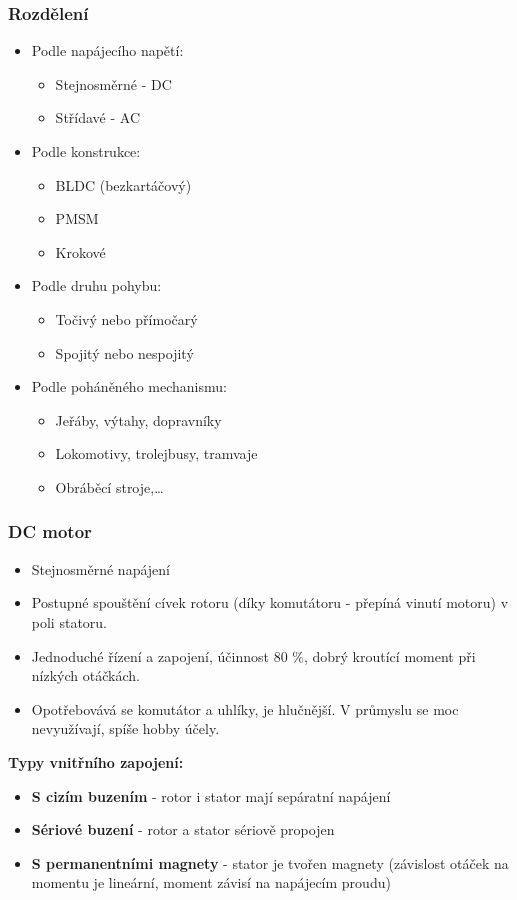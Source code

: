 \subsubsection*{Rozdělení}
\begin{itemize}
  \item Podle napájecího napětí: \begin{itemize}
    \item Stejnosměrné - DC
    \item Střídavé - AC 
  \end{itemize}
  \item Podle konstrukce: \begin{itemize}
    \item BLDC (bezkartáčový)
    \item PMSM 
    \item Krokové
  \end{itemize}
  \item Podle druhu pohybu: \begin{itemize}
    \item Točivý nebo přímočarý
    \item Spojitý nebo nespojitý
  \end{itemize}
  \item Podle poháněného mechanismu: \begin{itemize}
    \item Jeřáby, výtahy, dopravníky
    \item Lokomotivy, trolejbusy, tramvaje
    \item Obráběcí stroje,\dots
  \end{itemize}
\end{itemize}

\subsubsection*{DC motor}
\begin{itemize}
  \item Stejnosměrné napájení
  \item Postupné spouštění cívek rotoru (díky komutátoru - přepíná vinutí motoru) v poli statoru.
  \item Jednoduché řízení a zapojení, účinnost 80 \%, dobrý kroutící moment při nízkých otáčkách.
  \item Opotřebovává se komutátor a uhlíky, je hlučnější. V průmyslu se moc nevyužívají, spíše hobby účely.
\end{itemize}

\textbf{Typy vnitřního zapojení:}
\begin{itemize}
  \item \textbf{S cizím buzením} - rotor i stator mají sepáratní napájení
  \item \textbf{Sériové buzení} - rotor a stator sériově propojen
  \item \textbf{S permanentními magnety} - stator je tvořen magnety (závislost otáček na momentu je lineární, moment závisí na napájecím proudu)
\end{itemize}

